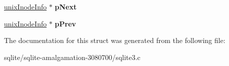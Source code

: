 \begin{DoxyCompactItemize}
\item 
\hypertarget{structunix_inode_info_a80181ba4ef71dd0d8e55e97baedc761e}{\hyperlink{structunix_inode_info}{unix\+Inode\+Info} $\ast$ {\bfseries p\+Next}}\label{structunix_inode_info_a80181ba4ef71dd0d8e55e97baedc761e}

\item 
\hypertarget{structunix_inode_info_a6575edce9898b48870c6f48047c01d01}{\hyperlink{structunix_inode_info}{unix\+Inode\+Info} $\ast$ {\bfseries p\+Prev}}\label{structunix_inode_info_a6575edce9898b48870c6f48047c01d01}

\end{DoxyCompactItemize}


The documentation for this struct was generated from the following file\+:\begin{DoxyCompactItemize}
\item 
sqlite/sqlite-\/amalgamation-\/3080700/sqlite3.\+c\end{DoxyCompactItemize}
